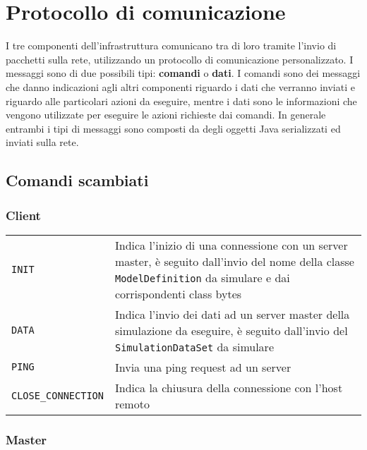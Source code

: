 
\section{Protocollo di comunicazione}

I tre componenti dell'infrastruttura comunicano tra di loro tramite l'invio di pacchetti sulla rete, utilizzando un protocollo di comunicazione personalizzato. 
I messaggi sono di due possibili tipi: \textbf{comandi} o \textbf{dati}. I comandi sono dei messaggi che danno indicazioni agli altri componenti riguardo i dati che verranno inviati e riguardo alle particolari azioni da eseguire, mentre i dati sono le informazioni che vengono utilizzate per eseguire le azioni richieste dai comandi. In generale entrambi i tipi di messaggi sono composti da degli oggetti Java serializzati ed inviati sulla rete.

\subsection{Comandi scambiati}

\subsubsection{Client}

\begin{table}[H]
    \begin{tabularx}{\linewidth}{ l X }
       \texttt{INIT}             & Indica l'inizio di una connessione con un server master, è seguito dall'invio del nome della classe \texttt{ModelDefinition} da simulare e dai corrispondenti class bytes \\
       \texttt{DATA}             & Indica l'invio dei dati ad un server master della simulazione da eseguire, è seguito dall'invio del \texttt{SimulationDataSet} da simulare \\
       \texttt{PING}             & Invia una ping request ad un server \\
       \texttt{CLOSE\_CONNECTION} & Indica la chiusura della connessione con l'host remoto
    \end{tabularx}
\end{table}

\subsubsection{Master}

